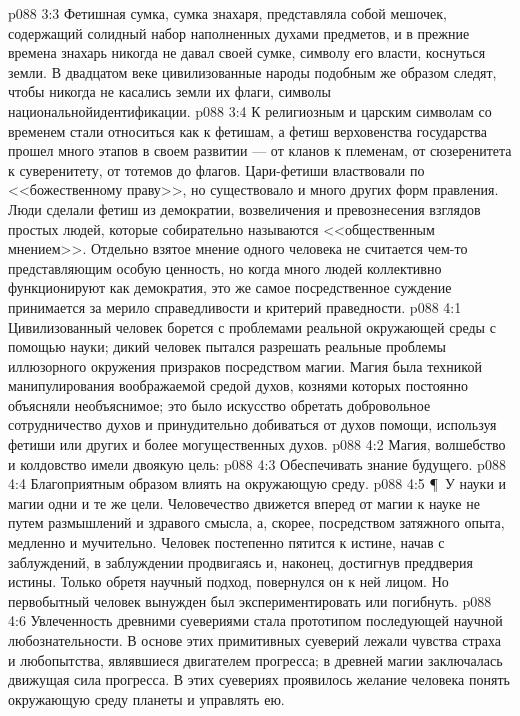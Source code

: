 \vs p088 3:3 Фетишная сумка, сумка знахаря, представляла собой мешочек, содержащий солидный набор наполненных духами предметов, и в прежние времена знахарь никогда не давал своей сумке, символу его власти, коснуться земли. В двадцатом веке цивилизованные народы подобным же образом следят, чтобы никогда не касались земли их флаги, символы национальнойидентификации.
\vs p088 3:4 К религиозным и царским символам со временем стали относиться как к фетишам, а фетиш верховенства государства прошел много этапов в своем развитии --- от кланов к племенам, от сюзеренитета к суверенитету, от тотемов до флагов. Цари\hyp{}фетиши властвовали по <<божественному праву>>, но существовало и много других форм правления. Люди сделали фетиш из демократии, возвеличения и превознесения взглядов простых людей, которые собирательно называются <<общественным мнением>>. Отдельно взятое мнение одного человека не считается чем\hyp{}то представляющим особую ценность, но когда много людей коллективно функционируют как демократия, это же самое посредственное суждение принимается за мерило справедливости и критерий праведности.
\vs p088 4:1 Цивилизованный человек борется с проблемами реальной окружающей среды с помощью науки; дикий человек пытался разрешать реальные проблемы иллюзорного окружения призраков посредством магии. Магия была техникой манипулирования воображаемой средой духов, кознями которых постоянно объясняли необъяснимое; это было искусство обретать добровольное сотрудничество духов и принудительно добиваться от духов помощи, используя фетиши или других и более могущественных духов.
\vs p088 4:2 Магия, волшебство и колдовство имели двоякую цель:
\vs p088 4:3 \bibnobreakspace Обеспечивать знание будущего.
\vs p088 4:4 \bibnobreakspace Благоприятным образом влиять на окружающую среду.
\vs p088 4:5 \P\ У науки и магии одни и те же цели. Человечество движется вперед от магии к науке не путем размышлений и здравого смысла, а, скорее, посредством затяжного опыта, медленно и мучительно. Человек постепенно пятится к истине, начав с заблуждений, в заблуждении продвигаясь и, наконец, достигнув преддверия истины. Только обретя научный подход, повернулся он к ней лицом. Но первобытный человек вынужден был экспериментировать или погибнуть.
\vs p088 4:6 Увлеченность древними суевериями стала прототипом последующей научной любознательности. В основе этих примитивных суеверий лежали чувства страха и любопытства, являвшиеся двигателем прогресса; в древней магии заключалась движущая сила прогресса. В этих суевериях проявилось желание человека понять окружающую среду планеты и управлять ею.
